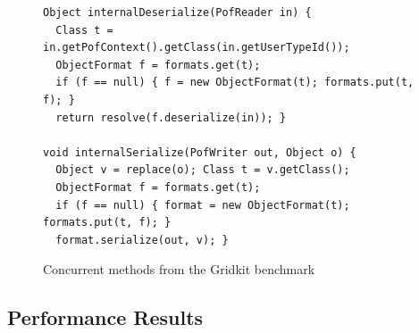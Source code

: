 \begin{figure}
%
\footnotesize
\begin{lstlisting}
Object internalDeserialize(PofReader in) {
  Class t = in.getPofContext().getClass(in.getUserTypeId());
  ObjectFormat f = formats.get(t);
  if (f == null) { f = new ObjectFormat(t); formats.put(t, f); }
  return resolve(f.deserialize(in)); }

void internalSerialize(PofWriter out, Object o) {
  Object v = replace(o); Class t = v.getClass();
  ObjectFormat f = formats.get(t);
  if (f == null) { format = new ObjectFormat(t); formats.put(t, f); }
  format.serialize(out, v); }
\end{lstlisting}
	\caption{\label{Fi:gridkitPair}Concurrent methods from the Gridkit benchmark}
\end{figure}

\subsection{Performance Results} 


